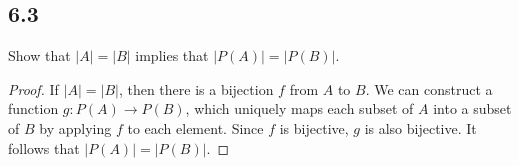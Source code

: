\subsection*{6.3} Show that $|A| = |B|$ implies that $|P(A)| = |P(B)|$.

\begin{proof}
If $|A| = |B|$, then there is a bijection $f$ from $A$ to $B$. We can construct a function $g:P(A) \rightarrow P(B)$, which uniquely maps each subset of $A$ into a subset of $B$ by applying $f$ to each element. Since $f$ is bijective, $g$ is also bijective. It follows that $|P(A)| = |P(B)|$.
\end{proof}

